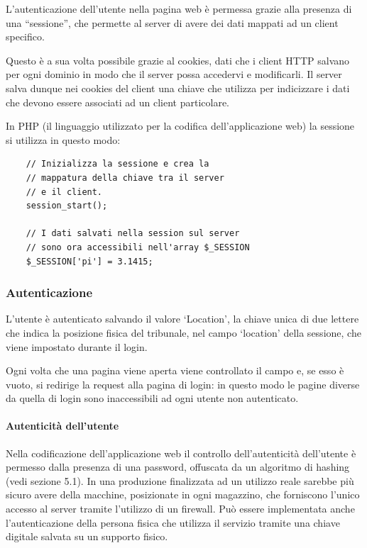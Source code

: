 L'autenticazione dell'utente nella pagina web è permessa grazie alla presenza di una ``sessione'', che permette al server di avere dei dati mappati ad un client specifico.

Questo è a sua volta possibile grazie al cookies, dati che i client HTTP salvano per ogni dominio in modo che il server possa accedervi e modificarli. Il server salva dunque nei cookies del client una chiave che utilizza per indicizzare i dati che devono essere associati ad un client particolare.

In PHP (il linguaggio utilizzato per la codifica dell'applicazione web) la sessione si utilizza in questo modo:
\lstset{language=php}
\begin{lstlisting}
    // Inizializza la sessione e crea la
    // mappatura della chiave tra il server
    // e il client.
    session_start();

    // I dati salvati nella session sul server
    // sono ora accessibili nell'array $_SESSION
    $_SESSION['pi'] = 3.1415;
\end{lstlisting}

\subsubsection{Autenticazione}

L'utente è autenticato salvando il valore `Location', la chiave unica di due lettere che indica la posizione fisica del tribunale, nel campo `location' della sessione, che viene impostato durante il login.

Ogni volta che una pagina viene aperta viene controllato il campo e, se esso è vuoto, si redirige la request alla pagina di login: in questo modo le pagine diverse da quella di login sono inaccessibili ad ogni utente non autenticato.

\paragraph{Autenticità dell'utente}
Nella codificazione dell'applicazione web il controllo dell'autenticità dell'utente è permesso dalla presenza di una password, offuscata da un algoritmo di hashing (vedi sezione 5.1). In una produzione finalizzata ad un utilizzo reale sarebbe più sicuro avere della macchine, posizionate in ogni magazzino, che forniscono l'unico accesso al server tramite l'utilizzo di un firewall. Può essere implementata anche l'autenticazione della persona fisica che utilizza il servizio tramite una chiave digitale salvata su un supporto fisico.

